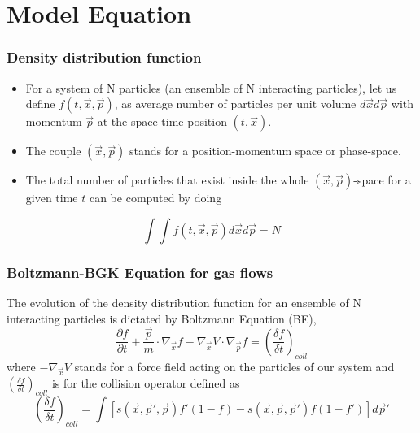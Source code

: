 \section{Model Equation}

\begin{frame} \frametitle{Density distribution function}
	\begin{itemize}
	\item For a system of N particles (an ensemble of N interacting particles), let us define $f(t,\vec{x},\vec{p})$, as average number of particles per unit volume $d\vec{x}d\vec{p}$ with momentum $\vec{p}$ at the space-time position $(t,\vec{x})$. \\
	\item The couple $(\vec{x},\vec{p})$ stands for a position-momentum space or phase-space.\\ 
	\item The total number of particles that exist inside the whole $(\vec{x},\vec{p})$-space for a given time $t$ can be computed by doing
	\end{itemize}
	\begin{equation}
	\int \int f(t,\vec{x},\vec{p})d\vec{x}d\vec{p} = N
	\end{equation}
\end{frame}

\begin{frame} \frametitle{Boltzmann-BGK Equation for gas flows}
	The evolution of the density distribution function for an ensemble of N interacting particles is dictated by Boltzmann Equation (BE),  
	\begin{equation}
	\frac{\partial{f}}{\partial{t}} +
	\frac{\vec{p}}{m}\cdot\nabla_{\vec{x}}f -
	\nabla_{\vec{x}}V\cdot\nabla_{\vec{p}}f =
	\left(\frac{\delta f}{\delta t}\right)_{coll} 
	\label{eq:full_Boltzmann_equation}
	\end{equation}
	where $-\nabla_{\vec{x}}V$ stands for a force field acting on the particles of our system and $\left( \frac{\delta f}{\delta t}\right )_{coll}$ is for the collision operator defined as
	\begin{equation}
	\left( \frac{\delta f}{\delta t}\right )_{coll} = \int \left[ s(\vec{x},\vec{p}',\vec{p})f'(1-f)-s(\vec{x},\vec{p},\vec{p}')f(1-f') \right]d\vec{p}'
	\end{equation}
\end{frame}

